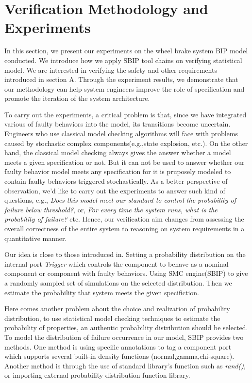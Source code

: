 

\section{Verification Methodology and Experiments}

In this section, we present our experiments on the wheel brake system BIP model conducted. We introduce how we apply SBIP tool chains on verifying statistical model. We are interested in verifying the safety and other requirements introduced in section A. Through the experiment results, we demonstrate that our methodology can help system engineers improve the role of specification and promote the iteration of the system architecture.

To carry out the experiments, a critical problem is that, since we have integrated various of faulty behaviors into the model, its transitions become uncertain. Engineers who use classical model checking algorithms will face with problems caused by stochastic complex components(e.g.,state explosion, etc.). On the other hand, the classical model checking always gives the answer whether a model meets a given specification or not. But it can not be used to answer whether our faulty behavior model meets any specification for it is pruposely modeled to contain faulty behaviors triggered stochastically. As a better perspective of observation, we'd like to carry out the experiments to answer such kind of questions, e.g., \emph{Does this model meet our standard to control the probability of failure below threshold?}, or, \emph{For every time the system runs, what is the probability of failure?} etc. Hence, our verification aim changes from assessing the overall correctness of the entire system to reasoning on system requirements in a quantitative manner.

Our idea is close to those introduced in\cite{smc10}\cite{smc10'}. Setting a probability distribution on the internal port \emph{Trigger} which controls the component to behave as a nominal component or component with faulty behaviors. Using SMC engine(SBIP) to give a randomly sampled set of simulations on the selected distribution. Then we estimate the probability that system meets the given specifiction. 

Here comes another problem about the choice and realization of probability distribution, to use statistical model checking techniques to estimate the probability of properties, an authentic probability distribution should be selected. To model the distribution of failure occurrence in our model, SBIP provides two methods. One method is using specific annotations to tag a component port which supports several built-in density functions (normal,gamma,chi-square). Another method is through the use of standard library's function such as \emph{rand()}, or importing external probability distribution function library.


